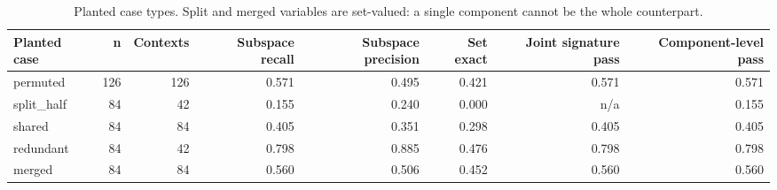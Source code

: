 \begin{table}[t]
\centering
\small
\begin{tabular}{lrrrrrrr}
\toprule
Planted case & n & Contexts & Subspace recall & Subspace precision & Set exact & Joint signature pass & Component-level pass \\
\midrule
permuted & 126 & 126 & 0.571 & 0.495 & 0.421 & 0.571 & 0.571 \\
split\_half & 84 & 42 & 0.155 & 0.240 & 0.000 & n/a & 0.155 \\
shared & 84 & 84 & 0.405 & 0.351 & 0.298 & 0.405 & 0.405 \\
redundant & 84 & 42 & 0.798 & 0.885 & 0.476 & 0.798 & 0.798 \\
merged & 84 & 84 & 0.560 & 0.506 & 0.452 & 0.560 & 0.560 \\
\bottomrule
\end{tabular}
\caption{Planted case types. Split and merged variables are set-valued: a single component cannot be the whole counterpart.}
\label{tab:set_valued_cases}
\end{table}